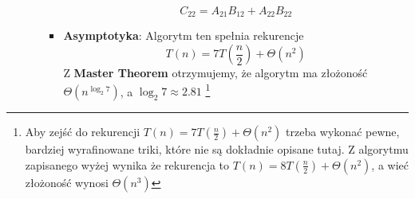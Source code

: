 \documentclass[11pt,a4paper]{article}
\begin{document}
\begin{itemize}
\begin{enumerate}
\begin{itemize}
\[                        \]
                        \[
                            C_{22} = A_{21}B_{12} + A_{22}B_{22}
                        \]
                    \item \textbf{Asymptotyka}: Algorytm ten spełnia rekurencje
                        \[
                            T(n) = 7T(\frac{n}{2}) + \Theta(n^2)
                        \]
                        Z \textbf{Master Theorem} otrzymujemy, że algorytm ma złożoność $\Theta(n^{\log_2 7})$, a $\log_2 7 \approx 2.81$
                        \footnote{Aby zejść do rekurencji $T(n) = 7T(\frac{n}{2}) + \Theta(n^2)$ trzeba wykonać pewne, bardziej wyrafinowane triki, które nie są dokładnie opisane tutaj. Z algorytmu zapisanego wyżej wynika że rekurencja to $T(n) = 8T(\frac{n}{2}) + \Theta(n^2)$, a wieć złożoność wynosi $\Theta(n^3)$}
                \end{itemize}
        \end{enumerate}
\end{itemize}
\end{document}
